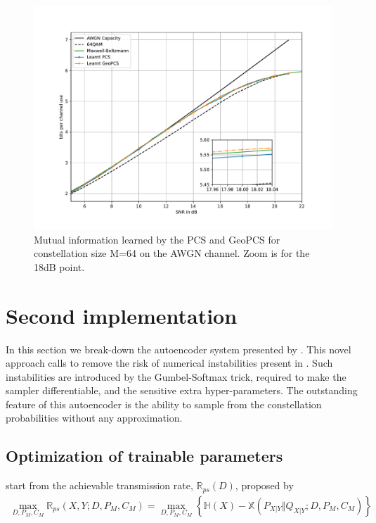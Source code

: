 \begin{figure}[h]
	\centering
	\includegraphics[width=\textwidth]{figs/stark_gcs.pdf}
    \caption{Mutual information learned by the PCS and GeoPCS for constellation size M=64 on the AWGN channel. Zoom is for the 18dB point.}
    \label{fig:starkPerf}
\end{figure}
\clearpage

\section{Second implementation}
In this section we break-down the autoencoder system presented by \citet{Aref}. This novel approach calls to remove the risk of numerical instabilities present in \cite{Stark}. Such instabilities are introduced by the Gumbel-Softmax trick, required to make the sampler differentiable, and the sensitive extra hyper-parameters. The outstanding feature of this autoencoder is the ability to sample from the constellation probabilities without any approximation.

\subsection{Optimization of trainable parameters}
\label{sec:parameters}
\citeauthor{Aref} start from the achievable transmission rate, $\mathbb{R}_{ps}(D)$, proposed by \citet{BoechererAR}
\begin{align}
	 \max_{D, P_M, C_M} \mathbb{R}_{ps}\left(X , Y ; D, P_M, C_M \right) =  \max_{D, P_M, C_M} \left\lbrace \mathbb{H}(X) - \mathbb{X}(P_{X|Y} \Vert Q_{X|Y} ; D, P_M, C_M) \right\rbrace
\end{align}

